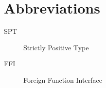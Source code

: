\chapter*{Abbreviations}\label{abbr}
\begin{description}
\item[SPT] Strictly Positive Type 
\item[FFI] Foreign Function Interface 
\end{description}